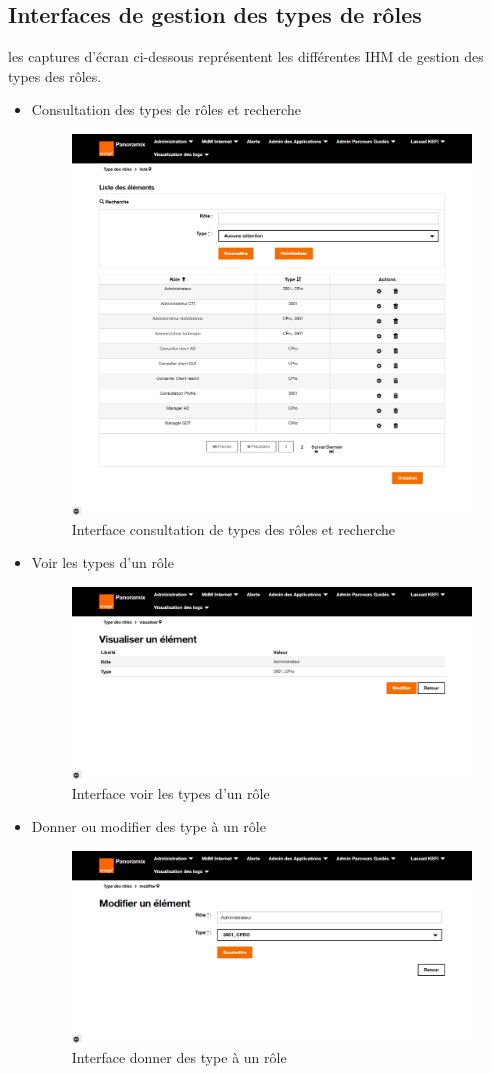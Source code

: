 \subsection{Interfaces de gestion des types de rôles}
les captures d'écran ci-dessous représentent les différentes IHM de gestion des types des rôles.
\newpage
\begin{itemize}
	\item Consultation des types de rôles et recherche
	\begin{figure}[H]
		\centering
		\includegraphics[width=0.7\linewidth]{"img/screenshots/type roles/index"}
		\caption[Interface consultation de types des rôles et recherche]{Interface consultation de types des rôles et recherche}
		\label{fig:index-tr}
	\end{figure}

	\item Voir les types d'un rôle 
	\begin{figure}[H]
		\centering
		\includegraphics[width=0.7\linewidth]{"img/screenshots/type roles/view"}
		\caption[Interface voir les types d'un rôle]{Interface voir les types d'un rôle}
		\label{fig:view-tr}
	\end{figure}
	\newpage
	\item Donner ou modifier des type à un rôle
	\begin{figure}[H]
		\centering
		\includegraphics[width=0.5\linewidth]{"img/screenshots/type roles/update"}
		\caption[Interface donner des type à un rôle]{Interface donner des type à un rôle}
		\label{fig:create-tr}
	\end{figure}
	

\end{itemize}
